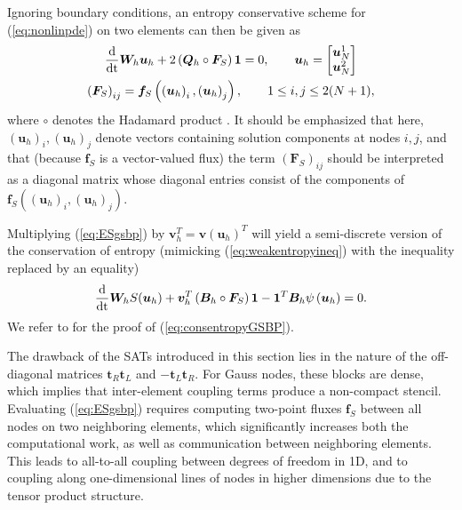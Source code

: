 \documentclass[review,onefignum,onetabnum,final]{siamart171218}
\newcommand{\td}[2]{\frac{{\rm d}#1}{{\rm d}{\rm #2}}}
\newcommand{\LRp}[1]{\left( #1 \right)}
\newcommand{\note}[1]{{\color{blue}{#1}}}
\begin{document}
Ignoring boundary conditions, an entropy conservative scheme for (\ref{eq:nonlinpde}) on two elements can then be given as
\begin{gather}
\td{}{t}\bm{W}_h\bm{u}_h + 2\LRp{\bm{Q}_h \circ \bm{F}_S}\bm{1} = 0, \qquad \bm{u}_h = \begin{bmatrix}
\bm{u}^1_N\\
\bm{u}^2_N
\end{bmatrix} \label{eq:ESgsbp} \\
\LRp{\bm{F}_S}_{ij} = \bm{f}_S\LRp{\LRp{\bm{u}_h}_i,\LRp{\bm{u}_h}_j}, \qquad 1 \leq  i,j \leq 2(N+1), \nonumber
\end{gather}
where $\circ$ denotes the Hadamard product \cite{horn2012matrix}.  {It should be emphasized that here, $(\bm{u}_h)_i, (\bm{u}_h)_j$ denote vectors containing solution components at nodes $i,j$, and that (because $\bm{f}_S$ is a vector-valued flux) the term $\LRp{\bm{F}_S}_{ij}$ should be interpreted as a diagonal matrix whose diagonal entries consist of the components of $\bm{f}_S\LRp{(\bm{u}_h)_i, (\bm{u}_h)_j}$.}

Multiplying (\ref{eq:ESgsbp}) by $\bm{v}_h^T = \bm{v}\LRp{\bm{u}_h}^T$ 
will yield a semi-discrete version of the conservation of entropy (mimicking (\ref{eq:weakentropyineq}) with the inequality replaced by an equality)
\begin{equation}
\label{eq:consentropyGSBP}
\td{}{t}\bm{W}_h S(\bm{u}_h) + \bm{v}_h^T\LRp{\bm{B}_h\circ \bm{F}_S}\bm{1} -\bm{1}^T\bm{B}_h\psi\LRp{\bm{u}_h} = 0.
\end{equation}
We refer to \cite{crean2017high, crean2018entropy} for the proof of (\ref{eq:consentropyGSBP}).  

The drawback of the SATs introduced in this section lies in the nature of the off-diagonal matrices $\bm{t}_R\bm{t}_L$ and $-\bm{t}_L\bm{t}_R$.  For Gauss nodes, these blocks are dense, which implies that inter-element coupling terms produce a non-compact stencil.  Evaluating (\ref{eq:ESgsbp}) requires computing two-point fluxes $\bm{f}_S$ between all nodes on two neighboring elements, which significantly increases both the computational work, as well as communication between neighboring elements.  This leads to all-to-all coupling between degrees of freedom in 1D, and to coupling along one-dimensional lines of nodes in higher dimensions due to the tensor product structure.  
\end{document}
